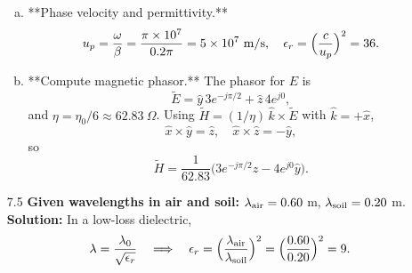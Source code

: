 \begin{enumerate}
\begin{enumerate}[(a)]
  \item **Phase velocity and permittivity.**  
  \[
    u_p=\frac{\omega}{\beta}=\frac{\pi\times10^7}{0.2\pi}=5\times10^7~\mathrm{m/s},\quad
    \epsilon_r=\Bigl(\frac{c}{u_p}\Bigr)^2=36.
  \]

  \item **Compute magnetic phasor.**  
  The phasor for $E$ is
  \[\tilde E=\hat y\,3e^{-j\pi/2}+\hat z\,4e^{j0},\]
  and $\eta=\eta_0/6\approx62.83~\Omega$.  Using $\tilde H=(1/\eta)\,\hat k\times\tilde E$ with $\hat k=+\hat x$,
  \[
    \hat x\times\hat y=\hat z,\quad
    \hat x\times\hat z=-\hat y,
  \]
  so
  \[
    \tilde H=\frac{1}{62.83}\bigl(3e^{-j\pi/2}\hat z -4e^{j0}\hat y\bigr).
  \]
\end{enumerate}

\item[7.5] \textbf{Given wavelengths in air and soil:} $\lambda_{\rm air}=0.60$ m, $\lambda_{\rm soil}=0.20$ m.  
\textbf{Solution:}
In a low-loss dielectric,
\[
  \lambda=\frac{\lambda_0}{\sqrt{\epsilon_r}}
  \quad\Longrightarrow\quad
  \epsilon_r=\Bigl(\frac{\lambda_{\rm air}}{\lambda_{\rm soil}}\Bigr)^2
  =\Bigl(\frac{0.60}{0.20}\Bigr)^2=9.
\]

\end{enumerate}

